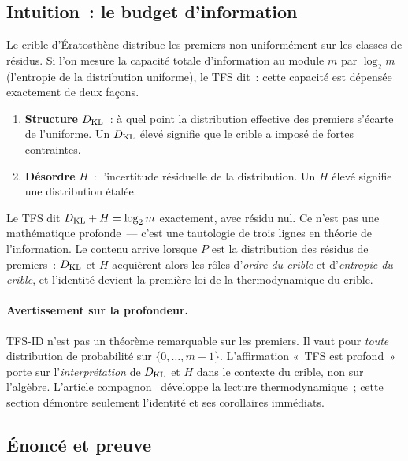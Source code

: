 \documentclass[12pt,a4paper]{article}
\begin{document}
\subsection{Intuition~: le budget d'information}
\label{sec:ch4_intuition}

Le crible d'Ératosthène distribue les premiers non uniformément sur
les classes de résidus. Si l'on mesure la capacité totale
d'information au module $m$ par $\log_2 m$ (l'entropie de la
distribution uniforme), le TFS dit~: cette capacité est dépensée
exactement de deux façons.

\begin{enumerate}
\item \textbf{Structure} $D_{\mathrm{KL}}$~: à quel point la distribution
  effective des premiers s'écarte de l'uniforme. Un $D_{\mathrm{KL}}$ élevé
  signifie que le crible a imposé de fortes contraintes.
\item \textbf{Désordre} $H$~: l'incertitude résiduelle de la
  distribution. Un $H$ élevé signifie une distribution étalée.
\end{enumerate}

Le TFS dit $D_{\mathrm{KL}} + H = \log_2 m$ exactement, avec résidu nul. Ce n'est
pas une mathématique profonde~--- c'est une tautologie de trois
lignes en théorie de l'information. Le contenu arrive lorsque $P$ est
la distribution des résidus de premiers~: $D_{\mathrm{KL}}$ et $H$ acquièrent
alors les rôles d'\emph{ordre du crible} et d'\emph{entropie du
crible}, et l'identité devient la première loi de la thermodynamique
du crible.

\paragraph{Avertissement sur la profondeur.}
TFS-ID n'est pas un théorème remarquable sur les premiers. Il vaut
pour \emph{toute} distribution de probabilité sur
$\{0, \ldots, m-1\}$. L'affirmation «~TFS est profond~» porte sur
l'\emph{interprétation} de $D_{\mathrm{KL}}$ et $H$ dans le contexte du crible,
non sur l'algèbre. L'article compagnon~\cite{companion_M5} développe
la lecture thermodynamique~; cette section démontre seulement
l'identité et ses corollaires immédiats.

\subsection{Énoncé et preuve}
\label{sec:gft_statement}
\end{document}
